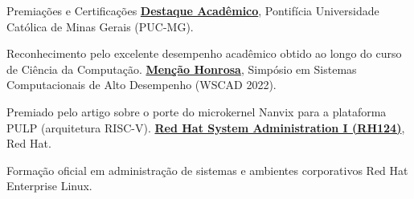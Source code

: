 \begin{rubric}{Premiações e Certificações}
\entry*[2023]%
    \textbf{\href{https://drive.google.com/file/d/12qYDL3kjxXrC2aeyzYn55hH6AOMMZ2Ni/view?usp=sharing}{Destaque Acadêmico}}, Pontifícia Universidade Católica de Minas Gerais (PUC-MG).
    \par Reconhecimento pelo excelente desempenho acadêmico obtido ao longo do curso de Ciência da Computação.
%
\entry*[2022]%
    \textbf{\href{https://drive.google.com/file/d/1EJsnv8WvVObpRNreRR2fV2hepMs9ifsz/view?usp=sharing}{Menção Honrosa}}, Simpósio em Sistemas Computacionais de Alto Desempenho (WSCAD 2022).
    \par Premiado pelo artigo sobre o porte do microkernel Nanvix para a plataforma PULP (arquitetura RISC-V).
%
\entry*[2021]%
    \textbf{\href{https://drive.google.com/file/d/1lU3JSlKmsZNY8PTN7REnLiKwlH6Fkpzm/view?usp=sharing}{Red Hat System Administration I (RH124)}}, Red Hat.
    \par Formação oficial em administração de sistemas e ambientes corporativos Red Hat Enterprise Linux.
\end{rubric}
